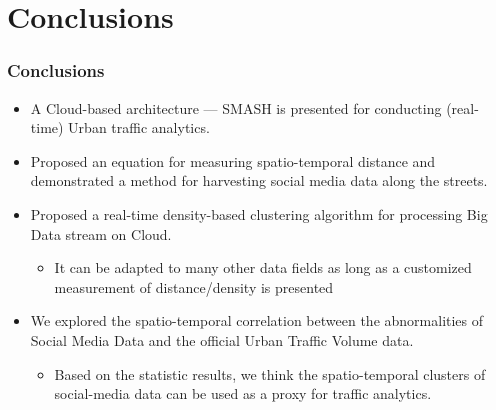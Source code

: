 \section{Conclusions}
\begin{frame}
    \frametitle{Conclusions}
    \begin{itemize} \small
	    \item A Cloud-based architecture --- SMASH is presented for conducting (real-time) Urban traffic analytics.
	    \item Proposed an equation for measuring spatio-temporal distance and demonstrated a method for harvesting social media data along the streets.
	    \item Proposed a real-time density-based clustering algorithm for processing Big Data stream on Cloud.
	    \begin{itemize}
	        \item It can be adapted to many other data fields as long as a customized measurement of distance/density is presented
	    \end{itemize}
	    \item We explored the spatio-temporal correlation between the abnormalities of Social Media Data and the official Urban Traffic Volume data. 
	    \begin{itemize}
	        \item Based on the statistic results, we think the spatio-temporal clusters of social-media data can be used as a proxy for traffic analytics.  
	    \end{itemize}
    \end{itemize}
\end{frame}

